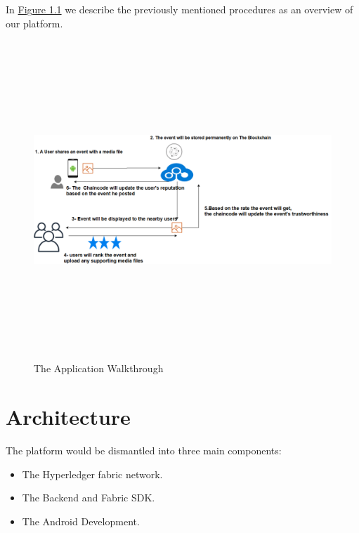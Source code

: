 \noindent In \hyperref[fig:appflow]{Figure 1.1} we describe the previously mentioned procedures as an overview of our platform.
	\begin{figure}[H]
	\includegraphics[width=15cm,height=12cm]{images/appflow.png}
	\caption{The Application Walkthrough}
	\label{fig:appflow}
	\end{figure}

\cleardoublepage

\section{Architecture}
The platform would be dismantled into three main components: 
\begin{itemize}
  \item The Hyperledger fabric network.
  \item The Backend and Fabric SDK. 
  \item The Android Development. 
\end{itemize}


